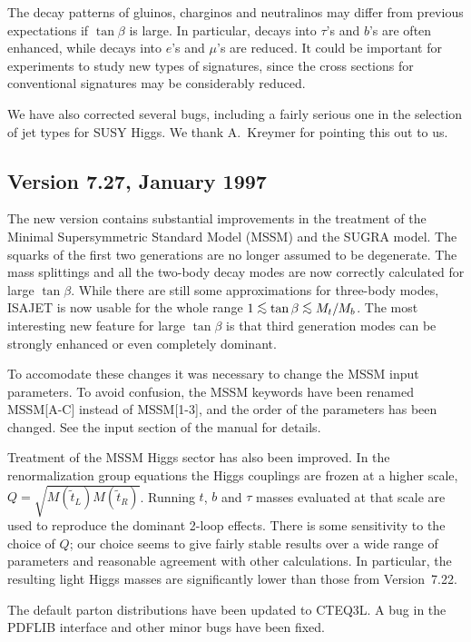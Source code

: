       The decay patterns of gluinos, charginos and neutralinos may
differ from previous expectations if $\tan\beta$ is large.  In
particular, decays into $\tau$'s and $b$'s are often enhanced, while
decays into $e$'s and $\mu$'s are reduced.  It could be important for
experiments to study new types of signatures, since the cross sections
for conventional signatures may be considerably reduced.

      We have also corrected several bugs, including a fairly
serious one in the selection of jet types for SUSY Higgs. We thank
A.~Kreymer for pointing this out to us.

\subsection{Version 7.27, January 1997}

      The new version contains substantial improvements in the
treatment of the Minimal Supersymmetric Standard Model (MSSM) and the
SUGRA model.  The squarks of the first two generations are no longer
assumed to be degenerate.  The mass splittings and all the two-body
decay modes are now correctly calculated for large $\tan\beta$.  While
there are still some approximations for three-body modes, ISAJET is
now usable for the whole range $1 \simle \tan\beta \simle M_t/M_b$.  The
most interesting new feature for large $\tan\beta$ is that third
generation modes can be strongly enhanced or even completely dominant.

      To accomodate these changes it was necessary to change the
MSSM input parameters.  To avoid confusion, the MSSM keywords have
been renamed MSSM[A-C] instead of MSSM[1-3], and the order of the
parameters has been changed.  See the input section of the manual for
details.

      Treatment of the MSSM Higgs sector has also been improved.  In
the renormalization group equations the Higgs couplings are frozen at
a higher scale, $Q = \sqrt{M(\tilde t_L)M(\tilde t_R)}$.  Running
$t$, $b$ and $\tau$ masses evaluated at that scale are used to
reproduce the dominant 2-loop effects.  There is some sensitivity to
the choice of $Q$; our choice seems to give fairly stable results over
a wide range of parameters and reasonable agreement with other
calculations.  In particular, the resulting light Higgs masses are
significantly lower than those from Version~7.22.  

      The default parton distributions have been updated to CTEQ3L.
A bug in the PDFLIB interface and other minor bugs have been fixed.

